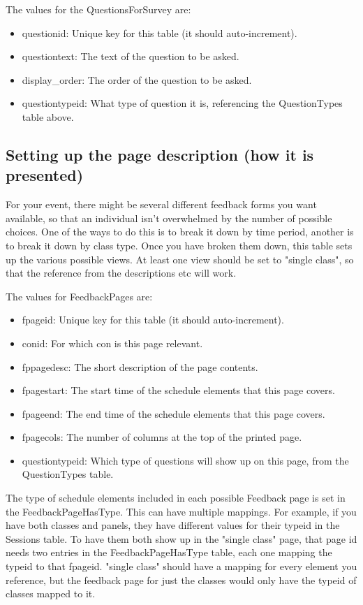 \documentclass[captions=tablesignature]{scrartcl}
\begin{document}
The values for the QuestionsForSurvey are:
\begin{itemize}
\item questionid: Unique key for this table (it should auto-increment).
\item questiontext: The text of the question to be asked.
\item display\_order: The order of the question to be asked.
\item questiontypeid: What type of question it is, referencing the
QuestionTypes table above.
\end{itemize}

\subsection{Setting up the page description (how it is presented)}
\label{sec-15-2}

For your event, there might be several different feedback forms you
want available, so that an individual isn't overwhelmed by the
number of possible choices.  One of the ways to do this is to break
it down by time period, another is to break it down by class type.
Once you have broken them down, this table sets up the various
possible views.  At least one view should be set to "single class",
so that the reference from the descriptions etc will work.

The values for FeedbackPages are:
\begin{itemize}
\item fpageid: Unique key for this table (it should auto-increment).
\item conid: For which con is this page relevant.
\item fppagedesc: The short description of the page contents.
\item fpagestart: The start time of the schedule elements that this
page covers.
\item fpageend: The end time of the schedule elements that this page
covers.
\item fpagecols: The number of columns at the top of the printed page.
\item questiontypeid: Which type of questions will show up on this
page, from the QuestionTypes table.
\end{itemize}

The type of schedule elements included in each possible Feedback
page is set in the FeedbackPageHasType.  This can have multiple
mappings.  For example, if you have both classes and panels, they
have different values for their typeid in the Sessions table.  To
have them both show up in the "single class" page, that page id
needs two entries in the FeedbackPageHasType table, each one
mapping the typeid to that fpageid.  "single class" should have a
mapping for every element you reference, but the feedback page for
just the classes would only have the typeid of classes mapped to
it.
\end{document}
